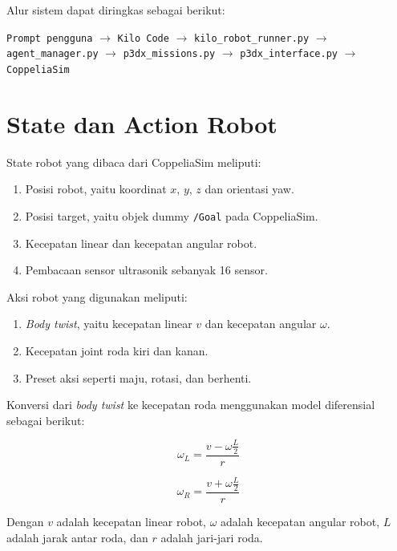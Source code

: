 \documentclass{article}
\begin{document}
Alur sistem dapat diringkas sebagai berikut:

\begin{center}
\texttt{Prompt pengguna} $\rightarrow$ \texttt{Kilo Code} $\rightarrow$ \texttt{kilo\_robot\_runner.py} $\rightarrow$ \texttt{agent\_manager.py} $\rightarrow$ \texttt{p3dx\_missions.py} $\rightarrow$ \texttt{p3dx\_interface.py} $\rightarrow$ \texttt{CoppeliaSim}
\end{center}

\section{State dan Action Robot}

State robot yang dibaca dari CoppeliaSim meliputi:

\begin{enumerate}[itemsep=0.2em]
    \item Posisi robot, yaitu koordinat $x$, $y$, $z$ dan orientasi yaw.
    \item Posisi target, yaitu objek dummy \texttt{/Goal} pada CoppeliaSim.
    \item Kecepatan linear dan kecepatan angular robot.
    \item Pembacaan sensor ultrasonik sebanyak 16 sensor.
\end{enumerate}

Aksi robot yang digunakan meliputi:

\begin{enumerate}[itemsep=0.2em]
    \item \textit{Body twist}, yaitu kecepatan linear $v$ dan kecepatan angular $\omega$.
    \item Kecepatan joint roda kiri dan kanan.
    \item Preset aksi seperti maju, rotasi, dan berhenti.
\end{enumerate}

Konversi dari \textit{body twist} ke kecepatan roda menggunakan model diferensial sebagai berikut:

\begin{equation}
    \omega_L = \frac{v - \omega \frac{L}{2}}{r}
\end{equation}

\begin{equation}
    \omega_R = \frac{v + \omega \frac{L}{2}}{r}
\end{equation}

Dengan $v$ adalah kecepatan linear robot, $\omega$ adalah kecepatan angular robot, $L$ adalah jarak antar roda, dan $r$ adalah jari-jari roda.
\end{document}
